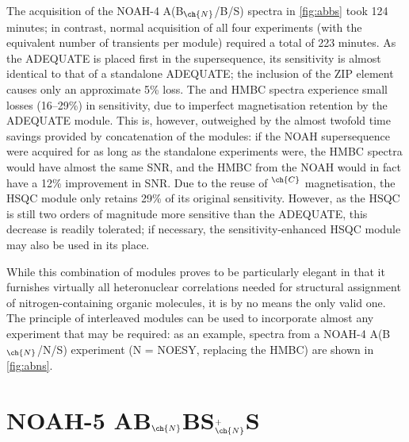 \documentclass[a4paper,12pt]{article}
\newcommand{\carbon}{\ch{^{13}C}}
\newcommand{\nitrogen}{\ch{^{15}N}}
\newcommand{\magn}[1]{\ch{^1H}$^{#1}$}
\newcommand{\abnbs}{NOAH-4 A(B$_{\ch{N}}$/B/S)}
\newcommand{\abnns}{NOAH-4 A(B$_{\ch{N}}$/N/S)}
\begin{document}
\begin{refsection}
The acquisition of the \abnbs{} spectra in \cref{fig:abbs} took 124 minutes; in contrast, normal acquisition of all four experiments (with the equivalent number of transients per module) required a total of 223 minutes.
As the ADEQUATE is placed first in the supersequence, its sensitivity is almost identical to that of a standalone ADEQUATE; the inclusion of the ZIP element causes only an approximate 5\% loss.
The \nitrogen{} and \carbon{} HMBC spectra experience small losses (16--29\%) in sensitivity, due to imperfect magnetisation retention by the ADEQUATE module.
This is, however, outweighed by the almost twofold time savings provided by concatenation of the modules: if the NOAH supersequence were acquired for as long as the standalone experiments were, the \nitrogen{} HMBC spectra would have almost the same SNR, and the \carbon{} HMBC from the NOAH would in fact have a 12\% improvement in SNR.
Due to the reuse of \magn{\ch{C}} magnetisation, the HSQC module only retains 29\% of its original sensitivity.
However, as the HSQC is still two orders of magnitude more sensitive than the ADEQUATE, this decrease is readily tolerated; if necessary, the sensitivity-enhanced HSQC module\autocite{Hansen2021AC,Yong2021JMR} may also be used in its place.

While this combination of modules proves to be particularly elegant in that it furnishes virtually all heteronuclear correlations needed for structural assignment of nitrogen-containing organic molecules, it is by no means the only valid one.
The principle of interleaved modules can be used to incorporate almost any experiment that may be required: as an example, spectra from a \abnns{} experiment (N = NOESY, replacing the \carbon{} HMBC) are shown in \cref{fig:abns}.

\section{NOAH-5 AB\texorpdfstring{$_{\ch{N}}$}{n}BS\texorpdfstring{$^+_{\ch{N}}$}{+n}S}


\end{refsection}
\end{document}
